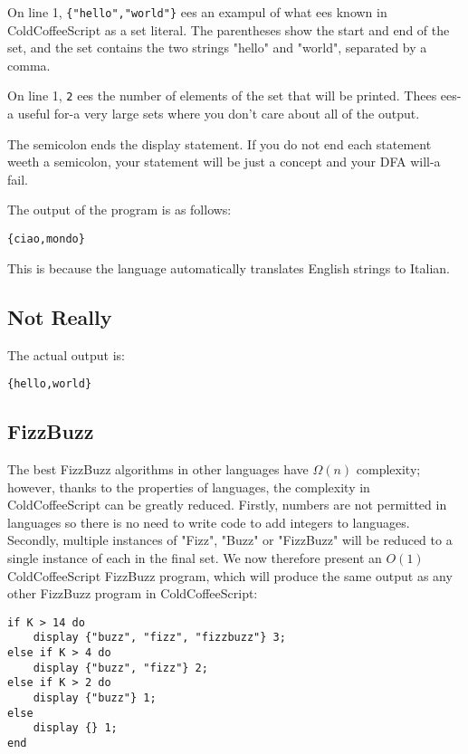 \documentclass{article}
\begin{document}
On line 1, \lstinline|{"hello","world"}| ees an exampul of what ees known in ColdCoffeeScript as a set literal. The parentheses show the start and end of the set, and the set contains the two strings "hello" and "world", separated by a comma.

On line 1, \lstinline|2| ees the number of elements of the set that will be printed. Thees ees-a useful for-a very large sets where you don't care about all of the output.

The semicolon ends the display statement. If you do not end each statement weeth a semicolon, your statement will be just a concept and your DFA will-a fail.

The output of the program is as follows:
\begin{lstlisting}
{ciao,mondo}
\end{lstlisting}
This is because the language automatically translates English strings to Italian.
\newpage
\subsection{Not Really}
The actual output is:
\begin{lstlisting}
{hello,world}
\end{lstlisting}
\subsection{FizzBuzz}
The best FizzBuzz algorithms in other languages have \(\Omega (n)\) complexity; however, thanks to the properties of languages, the complexity in ColdCoffeeScript can be greatly reduced. Firstly, numbers are not permitted in languages so there is no need to write code to add integers to languages. Secondly, multiple instances of "Fizz", "Buzz" or "FizzBuzz" will be reduced to a single instance of each in the final set. We now therefore present an \(O(1)\) ColdCoffeeScript FizzBuzz program, which will produce the same output as any other FizzBuzz program in ColdCoffeeScript:
\begin{lstlisting}
if K > 14 do
    display {"buzz", "fizz", "fizzbuzz"} 3;
else if K > 4 do
    display {"buzz", "fizz"} 2;
else if K > 2 do
    display {"buzz"} 1;
else
    display {} 1;
end
\end{lstlisting}
\end{document}
